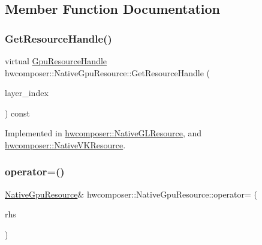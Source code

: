 \subsection{Member Function Documentation}
\mbox{\label{classhwcomposer_1_1NativeGpuResource_a3d514dcd1abfb90b874f681a7d7f50f7}} 
\subsubsection{\texorpdfstring{Get\+Resource\+Handle()}{GetResourceHandle()}}
{\footnotesize\ttfamily virtual \mbox{\hyperlink{namespacehwcomposer_a3da411c7c0213da2ce847c654bdc180d}{Gpu\+Resource\+Handle}} hwcomposer\+::\+Native\+Gpu\+Resource\+::\+Get\+Resource\+Handle (\begin{DoxyParamCaption}\item[{uint32\+\_\+t}]{layer\+\_\+index }\end{DoxyParamCaption}) const\hspace{0.3cm}{\ttfamily [pure virtual]}}



Implemented in \mbox{\hyperlink{classhwcomposer_1_1NativeGLResource_a9aa59ce44d000463c466fc0c5f91b3d4}{hwcomposer\+::\+Native\+G\+L\+Resource}}, and \mbox{\hyperlink{classhwcomposer_1_1NativeVKResource_a3402b7cdd51d36e65d5ccfa123e7224b}{hwcomposer\+::\+Native\+V\+K\+Resource}}.

\mbox{\label{classhwcomposer_1_1NativeGpuResource_a50e444ab9576fbae96115b36ee6ee385}} 
\subsubsection{\texorpdfstring{operator=()}{operator=()}\hspace{0.1cm}{\footnotesize\ttfamily [1/2]}}
{\footnotesize\ttfamily \mbox{\hyperlink{classhwcomposer_1_1NativeGpuResource}{Native\+Gpu\+Resource}}\& hwcomposer\+::\+Native\+Gpu\+Resource\+::operator= (\begin{DoxyParamCaption}\item[{const \mbox{\hyperlink{classhwcomposer_1_1NativeGpuResource}{Native\+Gpu\+Resource}} \&}]{rhs }\end{DoxyParamCaption})\hspace{0.3cm}{\ttfamily [delete]}}

